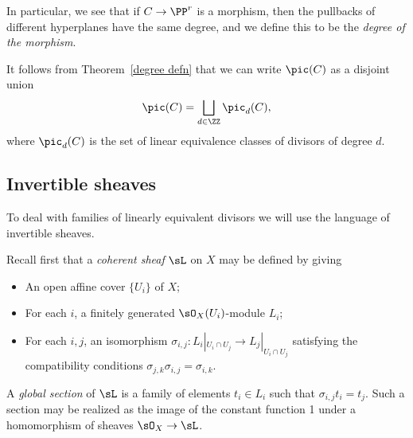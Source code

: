 In particular, we see that if $C\to \PP^{r}$ is a morphism, then the pullbacks of different hyperplanes
have the same degree, and we define this to be the \emph{degree of the morphism}.

It follows from Theorem~\ref{degree defn} that we can write $\pic(C)$ as a disjoint union
$$
\pic(C) = \bigsqcup_{d \in \ZZ} \pic_d(C),
$$
where $\pic_d(C)$ is the set of linear equivalence classes of divisors of degree $d$.


\subsection{Invertible sheaves}\label{Invertible sheaves}

To deal with families of linearly equivalent divisors we will use the language of invertible sheaves. 


Recall first that a \emph{coherent sheaf} $\sL$ on $X$ may be defined by
giving 
\begin{itemize}
 \item An open affine cover $\{U_{i}\}$ of $X$; 
 \item For each $i$, a finitely generated $\sO_{X}(U_{i})$-module $L_{i}$;
 \item For each $i,j$, an isomorphism $\sigma_{i,j}: L_{i}|_{U_{i}\cap U_{j}} \to L_{j}|_{U_{i}\cap U_{j}}$
 satisfying the compatibility conditions $\sigma_{j,k}\sigma_{i,j} = \sigma_{i,k}$. 
 \end{itemize}

A \emph{global section} of $\sL$ is a family of elements $t_{i}\in L_{i}$ such that 
$\sigma_{i,j} t_{i} = t_{j}$. Such a section may be realized as the image of the constant function 1 under
a homomorphism of sheaves $\sO_{X} \to \sL$. 

